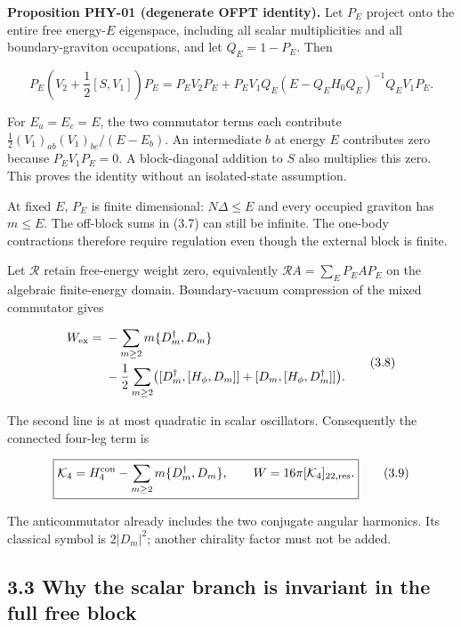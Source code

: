 \documentclass[a4paper,11pt]{article}
\numberwithin{equation}{section}
\begin{document}
\textbf{Proposition PHY-01 (degenerate OFPT identity).} Let \(P_E\) project onto the entire free energy-\(E\) eigenspace, including all scalar multiplicities and all boundary-graviton occupations, and let \(Q_E=1-P_E\). Then

\[
\boxed{
P_E\left(V_2+\frac12[S,V_1]\right)P_E
=P_EV_2P_E+
P_EV_1Q_E(E-Q_EH_0Q_E)^{-1}Q_EV_1P_E .
}
\tag{3.7}
\]

For \(E_a=E_c=E\), the two commutator terms each contribute \(\frac12(V_1)_{ab}(V_1)_{bc}/(E-E_b)\). An intermediate \(b\) at energy \(E\) contributes zero because \(P_EV_1P_E=0\). A block-diagonal addition to \(S\) also multiplies this zero. This proves the identity without an isolated-state assumption.

At fixed \(E\), \(P_E\) is finite dimensional: \(N\Delta\le E\) and every occupied graviton has \(m\le E\). The off-block sums in (3.7) can still be infinite. The one-body contractions therefore require regulation even though the external block is finite.

Let \(\mathcal R\) retain free-energy weight zero, equivalently \(\mathcal RA=\sum_EP_EAP_E\) on the algebraic finite-energy domain. Boundary-vacuum compression of the mixed commutator gives

\[
\begin{aligned}
W_{\rm ex}={}&-\sum_{m\ge2}m\{D_m^\dagger,D_m\}\\
&-\frac12\sum_{m\ge2}
\bigl([D_m^\dagger,[H_\phi,D_m]]
+[D_m,[H_\phi,D_m^\dagger]]\bigr).
\end{aligned}
\tag{3.8}
\]

The second line is at most quadratic in scalar oscillators. Consequently the connected four-leg term is

\[
\boxed{
\mathcal K_4=H_4^{\rm con}-\sum_{m\ge2}m\{D_m^\dagger,D_m\},
\qquad
W=16\pi[\mathcal K_4]_{22,\rm res}.
}
\tag{3.9}
\]

The anticommutator already includes the two conjugate angular harmonics. Its classical symbol is \(2|D_m|^2\); another chirality factor must not be added.

\hypertarget{why-the-scalar-branch-is-invariant-in-the-full-free-block}{%
\subsection{3.3 Why the scalar branch is invariant in the full free block}\label{why-the-scalar-branch-is-invariant-in-the-full-free-block}}
\end{document}
